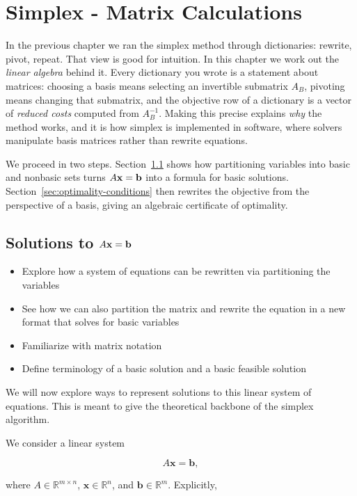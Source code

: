 \chapter{Simplex - Matrix Calculations}
\label{ch:simplex-matrix}

In the previous chapter we ran the simplex method through dictionaries: rewrite, pivot, repeat.  That view is good for intuition.  In this chapter we work out the \emph{linear algebra} behind it.  Every dictionary you wrote is a statement about matrices: choosing a basis means selecting an invertible submatrix $A_B$, pivoting means changing that submatrix, and the objective row of a dictionary is a vector of \emph{reduced costs} computed from $A_B^{-1}$.  Making this precise explains \emph{why} the method works, and it is how simplex is implemented in software, where solvers manipulate basis matrices rather than rewrite equations.

We proceed in two steps.  Section~\ref{sec:solutions-axb} shows how partitioning variables into basic and nonbasic sets turns $A\mathbf{x} = \mathbf{b}$ into a formula for basic solutions.  Section~\ref{sec:optimality-conditions} then rewrites the objective from the perspective of a basis, giving an algebraic certificate of optimality.

\section{Solutions to $A\mathbf{x} = \mathbf{b}$}
\label{sec:solutions-axb}
\begin{outcome}
\begin{itemize}
\item Explore how a system of equations can be rewritten via partitioning the variables
\item See how we can also partition the matrix and rewrite the equation in a new format that solves for basic variables
\item Familiarize with matrix notation
\item Define terminology of a basic solution and a basic feasible solution
\end{itemize}
\end{outcome}
We will now explore ways to represent solutions to this linear system of equations.  This is meant to give the theoretical backbone of the simplex algorithm.  

We consider a linear system

$$
A \mathbf{x} = \mathbf{b},
$$

where $A \in \mathbb{R}^{m \times n}$, $\mathbf{x} \in \mathbb{R}^n$, and $\mathbf{b} \in \mathbb{R}^m$. Explicitly,

